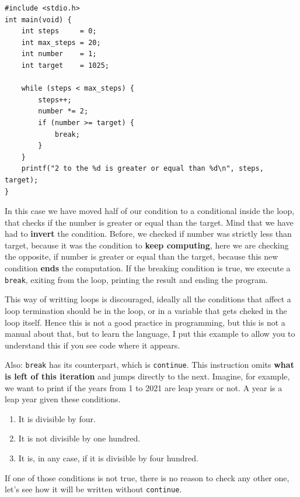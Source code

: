 \documentclass[a4paper]{article}
\begin{document}
\noindent
\begin{minipage}[H]{\linewidth}
\mbox{}
\begin{lstlisting}[style=C,
caption={Interrupción de un bucle con la instrucción \texttt{break}},
label={lst:breakExample}]
#include <stdio.h>
int main(void) {
    int steps     = 0;
    int max_steps = 20;
    int number    = 1;
    int target    = 1025;

    while (steps < max_steps) {
        steps++;
        number *= 2;
        if (number >= target) {
            break;
        }
    }
    printf("2 to the %d is greater or equal than %d\n", steps, target);
}
\end{lstlisting}
\end{minipage}

In this case we have moved half of our condition to a conditional inside the
loop, that checks if the number is greater or equal than the target.
Mind that we have had to \textbf{invert} the condition. Before, we checked if
number was strictly less than target, because it was the condition to
\textbf{keep computing}, here we are checking the opposite, if number is greater
or equal than the target, because this new condition \textbf{ends} the
computation.
If the breaking condition is true,
we execute a \texttt{break}, exiting from the loop, printing the result
and ending the program.

This way of writting loops is discouraged, ideally all
the conditions that affect a loop termination should be in the loop, or in a
variable that gets cheked in the loop itself. Hence this is not a good practice
in programming, but this is not a manual about that, but to learn the language,
I put this example to allow you to understand this if you see code where it
appears.

Also: \texttt{break} has its counterpart, which is \texttt{continue}. This
instruction omits \textbf{what is left of this iteration} and jumps directly to
the next. Imagine, for example, we want to print if the years from 1 to 2021 are
leap years or not. A year is a leap year given these conditions.
\begin{enumerate}
    \item It is divisible by four.
    \item It is not divisible by one hundred.
    \item It is, in any case, if it is divisible by four hundred.
\end{enumerate}

If one of those conditions is not true, there is no reason to check any other
one, let's see how it will be written without \texttt{continue}.
\end{document}
